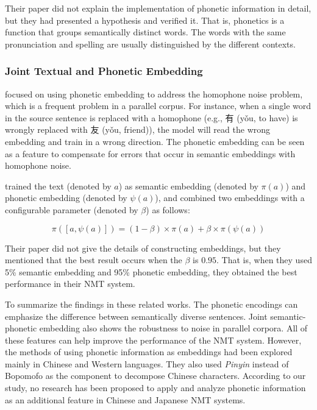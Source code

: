 Their paper did not explain the implementation of phonetic information in detail, but they had presented a hypothesis and verified it. That is, phonetics is a function that groups semantically distinct words. The words with the same pronunciation and spelling are usually distinguished by the different contexts.

\subsubsection{Joint Textual and Phonetic Embedding}

\cite{liu-etal-2019-robust} focused on using phonetic embedding to address the homophone noise problem, which is a frequent problem in a parallel corpus. For instance, when a single word in the source sentence is replaced with a homophone (e.g., 有 (yǒu, to have) is wrongly replaced with 友 (yǒu, friend)), the model will read the wrong embedding and train in a wrong direction. The phonetic embedding can be seen as a feature to compensate for errors that occur in semantic embeddings with homophone noise.

\cite{liu-etal-2019-robust} trained the text (denoted by $a$) as semantic embedding (denoted by $\pi(a)$) and phonetic embedding (denoted by $\psi(a)$), and combined two embeddings with a configurable parameter (denoted by $\beta$) as follows:

\begin{equation*}
	\pi([a, \psi(a)]) = (1-\beta) \times \pi(a) + \beta \times \pi(\psi(a)) 
\end{equation*}

Their paper did not give the details of constructing embeddings, but they mentioned that the best result occurs when the $\beta$ is $0.95$. That is, when they used 5\% semantic embedding and 95\% phonetic embedding, they obtained the best performance in their NMT system.

To summarize the findings in these related works. The phonetic encodings can emphasize the difference between semantically diverse sentences.  Joint semantic-phonetic embedding also shows the robustness to noise in parallel corpora. All of these features can help improve the performance of the NMT system. However, the methods of using phonetic information as embeddings had been explored mainly in Chinese and Western languages. They also used \textit{Pinyin} instead of Bopomofo as the component to decompose Chinese characters. According to our study, no research has been proposed to apply and analyze phonetic information as an additional feature in Chinese and Japanese NMT systems.
